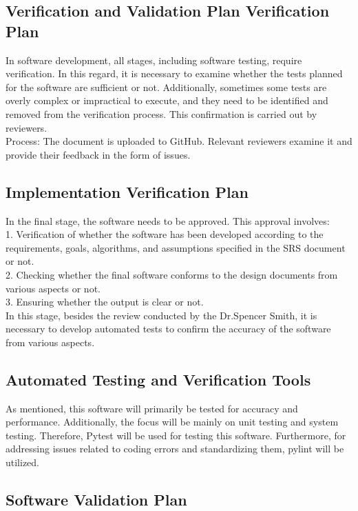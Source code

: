 \documentclass[12pt, titlepage]{article}
\begin{document}
\subsection{Verification and Validation Plan Verification Plan}
In software development, all stages, including software testing, require verification. In this regard, it is necessary to examine whether the tests planned for the software are sufficient or not. Additionally, sometimes some tests are overly complex or impractical to execute, and they need to be identified and removed from the verification process. This confirmation is carried out by reviewers.\\

Process: The document is uploaded to GitHub. Relevant reviewers examine it and provide their feedback in the form of issues.
\subsection{Implementation Verification Plan}



In the final stage, the software needs to be approved. This approval involves:\\
1. Verification of whether the software has been developed according to the requirements, goals, algorithms, and assumptions specified in the SRS document or not.\\
2. Checking whether the final software conforms to the design documents from various aspects or not.\\
3. Ensuring whether the output is clear or not.\\
In this stage, besides the review conducted by the Dr.Spencer Smith, it is necessary to develop automated tests to confirm the accuracy of the software from various aspects.
\subsection{Automated Testing and Verification Tools}

As mentioned, this software will primarily be tested for accuracy and performance. Additionally, the focus will be mainly on unit testing and system testing. Therefore, Pytest will be used for testing this software. Furthermore, for addressing issues related to coding errors and standardizing them, pylint will be utilized.

\subsection{Software Validation Plan}
\end{document}
